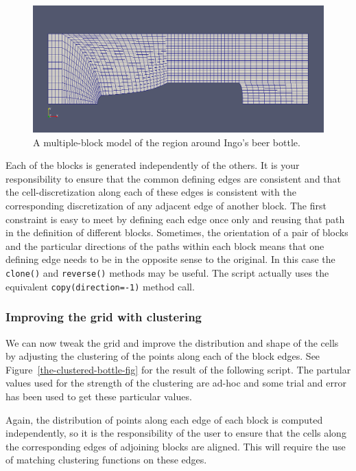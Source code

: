 \begin{figure}[htbp]
\begin{center}
\includegraphics[width=\textwidth]{../2D/beer-bottle/the_plain_bottle.png}
\end{center}
\caption{A multiple-block model of the region around Ingo's beer bottle.}
\label{the-plain-bottle-fig}
\end{figure}

\medskip
Each of the blocks is generated independently of the others.
It is your responsibility to ensure that the common defining edges are 
consistent and that the cell-discretization along each of these edges 
is consistent with the corresponding discretization of any adjacent edge 
of another block.
The first constraint is easy to meet by defining each edge once only and
reusing that path in the definition of different blocks.
Sometimes, the orientation of a pair of blocks and 
the particular directions of the paths within each block means that 
one defining edge needs to be in the opposite sense to the original.
In this case the \texttt{clone()} and \texttt{reverse()} methods may be useful.
The script actually uses the equivalent \texttt{copy(direction=-1)} method call.

\subsubsection*{Improving the grid with clustering}
%
We can now tweak the grid and improve the distribution and shape of the cells
by adjusting the clustering of the points along each of the block edges.
See Figure~\ref{the-clustered-bottle-fig} for the result of the following script.
The partular values used for the strength of the clustering are ad-hoc and some
trial and error has been used to get these particular values.

\medskip
Again, the distribution of points along each edge of each block is computed independently,
so it is the responsibility of the user to ensure that the cells along the 
corresponding edges of adjoining blocks are aligned.
This will require the use of matching clustering functions on these edges.

